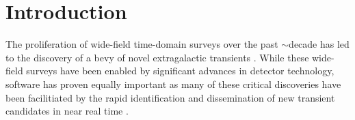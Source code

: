 \documentclass[twocolumn]{aastex63}
\begin{document}


\section{Introduction} \label{sec:intro}

The proliferation of wide-field time-domain surveys over the past $\sim$decade
has led to the discovery of a bevy of novel extragalactic transients
\citep[e.g.,][]{quimby11,Gezari12,Drout14,Gal-Yam14,Abbott17a,Prentice18,
IceCube-Collaboration18}. While these wide-field surveys have been enabled by
significant advances in detector technology, software has proven equally
important \citep[e.g.,][]{Masci17,Masci19,Smith20,Jones20} as many of these
critical discoveries have been facilitiated by the rapid identification and
dissemination of new transient candidates in near real time
\citep[e.g.,][]{Patterson19}.
\end{document}
